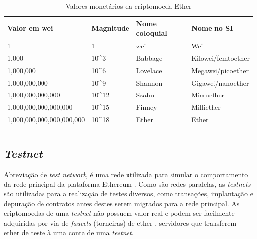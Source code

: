  \begin{table}[H]
 \centering
\begin{tabular}{llll}
\hline
\multicolumn{1}{|l|}{Valor em wei} & \multicolumn{1}{l|}{Magnitude} & \multicolumn{1}{l|}{Nome coloquial} & \multicolumn{1}{l|}{Nome no SI} \\ \hline
\multicolumn{1}{|l|}{1} & \multicolumn{1}{l|}{1} & \multicolumn{1}{l|}{wei} & \multicolumn{1}{l|}{Wei} \\ \hline
\multicolumn{1}{|l|}{1,000} & \multicolumn{1}{l|}{10\textasciicircum{}3} & \multicolumn{1}{l|}{Babbage} & \multicolumn{1}{l|}{Kilowei/femtoether} \\ \hline
\multicolumn{1}{|l|}{1,000,000} & \multicolumn{1}{l|}{10\textasciicircum{}6} & \multicolumn{1}{l|}{Lovelace} & \multicolumn{1}{l|}{Megawei/picoether} \\ \hline
\multicolumn{1}{|l|}{1,000,000,000} & \multicolumn{1}{l|}{10\textasciicircum{}9} & \multicolumn{1}{l|}{Shannon} & \multicolumn{1}{l|}{Gigawei/nanoether} \\ \hline
\multicolumn{1}{|l|}{1,000,000,000,000} & \multicolumn{1}{l|}{10\textasciicircum{}12} & \multicolumn{1}{l|}{Szabo} & \multicolumn{1}{l|}{Microether} \\ \hline
\multicolumn{1}{|l|}{1,000,000,000,000,000} & \multicolumn{1}{l|}{10\textasciicircum{}15} & \multicolumn{1}{l|}{Finney} & \multicolumn{1}{l|}{Milliether} \\ \hline
\multicolumn{1}{|l|}{1,000,000,000,000,000,000} & \multicolumn{1}{l|}{10\textasciicircum{}18} & \multicolumn{1}{l|}{Ether} & \multicolumn{1}{l|}{Ether} \\ \hline
 &  &  &  \\
 &  &  &     
\end{tabular}
\caption{Valores monetários da criptomoeda Ether}
    \label{tab:tabela_valores_ether}
\end{table}


\subsection{\emph{Testnet}}
Abreviação de \emph{test network}, é uma rede utilizada para simular o comportamento da rede principal da plataforma Ethereum \cite{Antonopoulos2018-jt}. Como são redes paralelas, as \emph{testnets} são utilizadas para a realização de testes diversos, como transações, implantação e depuração de contratos antes destes serem migrados para a rede principal. As criptomoedas de uma \emph{testnet} não possuem valor real e podem ser facilmente adquiridas por via de \emph{faucets} (torneiras) de ether \cite{Dannen2017-eb}, servidores que transferem ether de teste à uma conta de uma \emph{testnet}.

